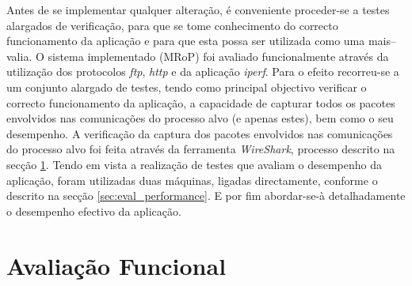 








Antes de se implementar qualquer alteração, é conveniente proceder-se a testes alargados de verificação, para que se tome conhecimento do correcto funcionamento da aplicação e para que esta possa ser utilizada como uma mais–valia. 
O sistema implementado (MRoP) foi avaliado funcionalmente através da utilização dos protocolos \textit{ftp}, \textit{http} e da aplicação \textit{iperf}\cite{iperf}.
Para o efeito recorreu-se a um conjunto alargado de testes, tendo como principal objectivo verificar o correcto funcionamento da aplicação, a capacidade de capturar todos os pacotes envolvidos nas comunicações do processo alvo (e apenas estes), bem como o seu desempenho.
A verificação da captura dos pacotes envolvidos nas comunicações do processo alvo foi feita através da ferramenta \textit{WireShark}, processo descrito na secção \ref{sec:eval_functional}.
Tendo em vista a realização de testes que avaliam o desempenho da aplicação, foram utilizadas duas máquinas, ligadas directamente, conforme o descrito  na secção \ref{sec:eval_performance}.
E por fim abordar-se-à detalhadamente o desempenho efectivo da aplicação.


\section{Avaliação Funcional}
\label{sec:eval_functional}


